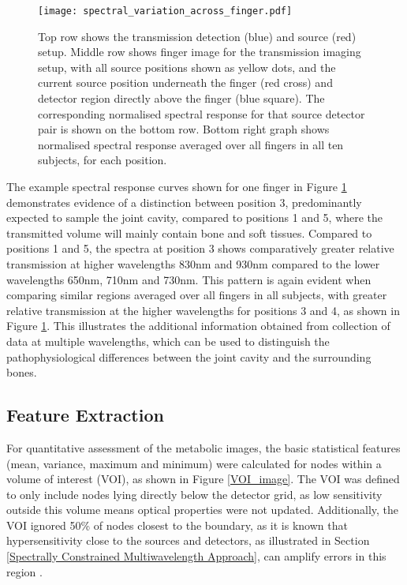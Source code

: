\documentclass[twoside]{bhamthesis}
\theoremstyle{definition}
\begin{document}
\begin{figure}[!ht]
\centering\texttt{[image: spectral\_variation\_across\_finger.pdf]}
\caption{Top row shows the transmission detection (blue) and source (red) setup. Middle row shows finger image for the transmission imaging setup, with all source positions shown as yellow dots, and the current source position underneath the finger (red cross) and detector region directly above the finger (blue square). The corresponding normalised spectral response for that source detector pair is shown on the bottom row. Bottom right graph shows normalised spectral response averaged over all fingers in all ten subjects, for each position.}
\label{spectral_variation_across_finger}
\end{figure}

The example spectral response curves shown for one finger in Figure \ref{spectral_variation_across_finger} demonstrates evidence of a distinction between position 3, predominantly expected to sample the joint cavity, compared to positions 1 and 5, where the transmitted volume will mainly contain bone and soft tissues. Compared to positions 1 and 5, the spectra at position 3 shows comparatively greater relative transmission at higher wavelengths 830nm and 930nm compared to the lower wavelengths 650nm, 710nm and 730nm. This pattern is again evident when comparing similar regions averaged over all fingers in all subjects, with greater relative transmission at the higher wavelengths for positions 3 and 4, as shown in Figure \ref{spectral_variation_across_finger}. This illustrates the additional information obtained from collection of data at multiple wavelengths, which can be used to distinguish the pathophysiological differences between the joint cavity and the surrounding bones.

\subsection{Feature Extraction} 
\label{Feature Extraction}
For quantitative assessment of the metabolic images, the basic statistical features (mean, variance, maximum and minimum) were calculated for nodes within a volume of interest (VOI), as shown in Figure \ref{VOI_image}. The VOI was defined to only include nodes lying directly below the detector grid, as low sensitivity outside this volume means optical properties were not updated. Additionally, the VOI ignored 50\% of nodes closest to the boundary, as it is known that hypersensitivity close to the sources and detectors, as illustrated in Section
\ref{Spectrally Constrained Multiwavelength Approach}, can amplify errors in this region \cite{boas2001simultaneous}. 
\end{document}
